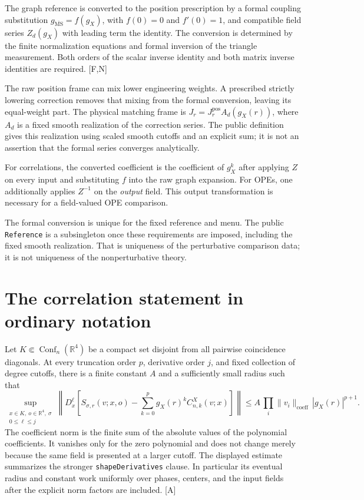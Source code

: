 \documentclass[11pt]{article}
\newcommand{\R}{\mathbb R}
\newcommand{\MS}{\overline{\mathrm{MS}}}
\newcommand{\code}[1]{{\small\nolinkurl{#1}}}
\newcommand{\src}[1]{\textsf{[#1]}}
\newcommand{\Conf}{\operatorname{Conf}}
\begin{document}
The graph reference is converted to the position prescription by a
formal coupling substitution $g_{\MS}=f(g_X)$, with $f(0)=0$ and
$f'(0)=1$, and compatible field series $Z_d(g_X)$ with leading term
the identity. The conversion is determined by the finite normalization
equations and formal inversion of the triangle measurement.
Both orders of the scalar inverse identity and both matrix inverse
identities are required. \src{F,N}

The raw position frame can mix lower engineering weights. A prescribed
strictly lowering correction removes that mixing from the formal
conversion, leaving its equal-weight part. The physical matching frame
is $J_r=J_r^{\mathrm{pos}}A_d(g_X(r))$, where $A_d$ is a fixed smooth
realization of the correction series. The public definition gives this
realization using scaled smooth cutoffs and an explicit sum; it is not
an assertion that the formal series converges analytically.

For correlations, the converted coefficient is the coefficient of
$g_X^k$ after applying $Z$ on every input and substituting $f$ into the
raw graph expansion. For OPEs, one additionally applies $Z^{-1}$ on the
\emph{output} field. This output transformation is necessary for a
field-valued OPE comparison.

The formal conversion is unique for the fixed reference and menu.
The public \code{Reference} is a subsingleton once these requirements
are imposed, including the fixed smooth realization. That is uniqueness
of the perturbative comparison data; it is not uniqueness of the
nonperturbative theory.

\section{The correlation statement in ordinary notation}
\label{sec:correlations}

Let $K\Subset\Conf_n(\R^4)$ be a compact set disjoint from all pairwise
coincidence diagonals. At every truncation order $p$, derivative order
$j$, and fixed collection of degree cutoffs, there is a finite constant
$A$ and a sufficiently small radius such that
\begin{equation}\label{eq:corr-bound}
 \sup_{\substack{x\in K,\ o\in\R^4,\ \sigma\\0\le\ell\le j}}
 \left\|D_x^\ell\left[
 S_{\sigma,r}(v;x,o)-\sum_{k=0}^{p}g_X(r)^k C^X_{n,k}(v;x)
 \right]\right\|
 \le A\,\prod_i\|v_i\|_{\mathrm{coeff}}\,|g_X(r)|^{p+1}.
\end{equation}
The coefficient norm is the finite sum of the absolute values of the
polynomial coefficients. It vanishes only for the zero polynomial and
does not change merely because the same field is presented at a larger
cutoff. The displayed estimate summarizes the stronger
\code{shapeDerivatives} clause. In particular its eventual radius and
constant work uniformly over phases, centers, and the input fields
after the explicit norm factors are included. \src{A}
\end{document}
